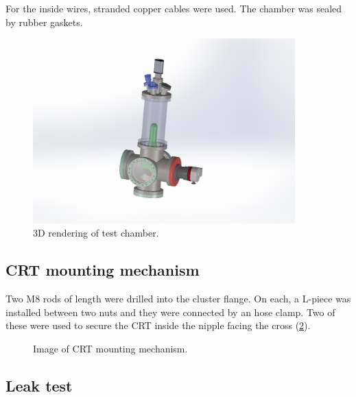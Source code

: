 For the inside wires, stranded copper cables were used. The chamber was sealed by rubber gaskets.
 
\begin{figure}[ht]
	\centering
 	
	\includegraphics[width=0.9\textwidth]{./Chapters/vacuum-chamber/test_chamber} %
	
	\caption{3D rendering of test chamber.}
	\label{fig:3D rendering of test chamber}
\end{figure}
 
\subsection{CRT mounting mechanism}
\label{subsec:CRT mounting mechanism}

 Two M8 rods of length  were drilled into the cluster flange. On each, a L-piece was installed between two nuts and they were connected by an hose clamp. Two of these were used to secure the CRT inside the nipple facing the cross (\cref{fig:Image of CRT mounting mechanism}).
 

\begin{figure}[h]
	\centering
	
	
	\caption{Image of CRT mounting mechanism.}
	\label{fig:Image of CRT mounting mechanism}
\end{figure}


\subsection{Leak test}
\label{subsec:Leak test}

